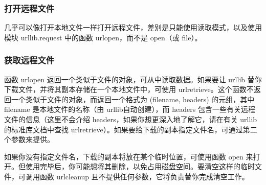 \subsubsection{打开远程文件}
几乎可以像打开本地文件一样打开远程文件，差别是只能使用读取模式，以及使用模块 urllib.request 中的函数 urlopen，而不是 open（或 file）。
\subsubsection{获取远程文件}
函数 urlopen 返回一个类似于文件的对象，可从中读取数据。如果要让 urllib 替你下载文件，并将其副本存储在一个本地文件中，可使用 urlretrieve。这个函数不返回一个类似于文件的对象，而返回一个格式为 (filename, headers) 的元组，其中 filename 是本地文件的名称（由 urllib自动创建），而 headers 包含一些有关远程文件的信息（这里不会介绍 headers，如果你想更深入地了解它，请在有关 urllib 的标准库文档中查找 urlretrieve）。如果要给下载的副本指定文件名，可通过第二个参数来提供。

如果你没有指定文件名，下载的副本将放在某个临时位置，可使用函数 open 来打开。但使用完毕后，你可能想将其删除，以免占用磁盘空间。要清空这样的临时文件，可调用函数 urlcleanup 且不提供任何参数，它将负责替你完成清空工作。